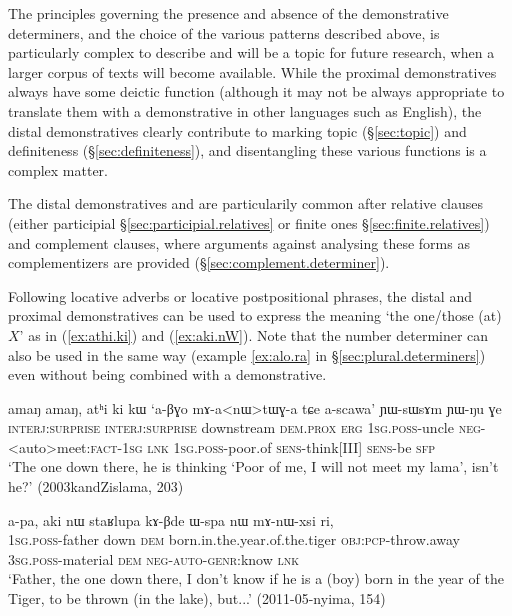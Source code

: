 The principles governing the presence and absence of the demonstrative determiners, and the choice of the various patterns described above, is particularly complex to describe and will be a topic for future research, when a larger corpus of texts will become available. While the proximal demonstratives always have some deictic function (although it may not be always appropriate to translate them with a demonstrative in other languages such as English), the distal demonstratives clearly contribute to marking topic (§\ref{sec:topic}) and definiteness (§\ref{sec:definiteness}), and disentangling these various functions is a complex matter.

The distal demonstratives  and  are particularily common after relative clauses (either participial §\ref{sec:participial.relatives} or finite ones §\ref{sec:finite.relatives}) and complement clauses, where arguments against analysing these forms as complementizers are provided (§\ref{sec:complement.determiner}).

Following locative adverbs or locative postpositional phrases, the distal and proximal demonstratives can be used to express the meaning `the one/those (at) $X$' as in (\ref{ex:athi.ki}) and (\ref{ex:aki.nW}). Note that the number determiner  can also be used in the same way (example \ref{ex:alo.ra} in §\ref{sec:plural.determiners}) even without being combined with a demonstrative.

\begin{exe}
\ex \label{ex:athi.ki}
\gll amaŋ amaŋ, atʰi ki kɯ `a-βɣo mɤ-a<nɯ>tɯɣ-a tɕe a-scawa' ɲɯ-sɯsɤm ɲɯ-ŋu ɣe \\
\textsc{interj}:\textsc{surprise} \textsc{interj}:\textsc{surprise}  downstream \textsc{dem}.\textsc{prox} \textsc{erg} \textsc{1sg}.\textsc{poss}-uncle \textsc{neg}-<auto>meet:\textsc{fact}-\textsc{1sg} \textsc{lnk} \textsc{1sg}.\textsc{poss}-poor.of \textsc{sens}-think[III] \textsc{sens}-be \textsc{sfp} \\
\glt `The one down there, he is thinking `Poor of me, I will not meet my lama', isn't he?' (2003kandZislama, 203)
\end{exe}

\begin{exe}
\ex \label{ex:aki.nW}
\gll a-pa, aki nɯ staʁlupa kɤ-βde ɯ-spa nɯ mɤ-nɯ-xsi ri, \\
\textsc{1sg}.\textsc{poss}-father down \textsc{dem} born.in.the.year.of.the.tiger \textsc{obj}:\textsc{pcp}-throw.away \textsc{3sg}.\textsc{poss}-material \textsc{dem} \textsc{neg}-\textsc{auto}-\textsc{genr}:know \textsc{lnk} \\
\glt `Father, the one down there, I don't know if he is a (boy) born in the year of the Tiger, to be thrown (in the lake), but...' (2011-05-nyima, 154)
\end{exe}

